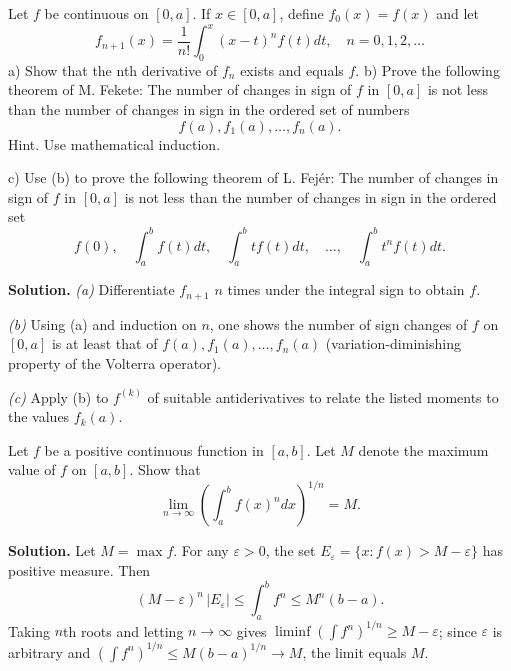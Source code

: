 \begin{problembox}
Let $f$ be continuous on $[0, a]$. If $x \in [0, a]$, define $f_0(x) = f(x)$ and let 
\[f_{n+1}(x) = \frac{1}{n!} \int_0^x (x - t)^n f(t) dt, \quad n = 0, 1, 2, \ldots\]
a) Show that the nth derivative of $f_n$ exists and equals $f$.
b) Prove the following theorem of M. Fekete: The number of changes in sign of $f$ in $[0, a]$ is not less than the number of changes in sign in the ordered set of numbers 
\[f(a), f_1(a), \ldots, f_n(a).\]
Hint. Use mathematical induction.

c) Use (b) to prove the following theorem of L. Fejér: The number of changes in sign of $f$ in $[0, a]$ is not less than the number of changes in sign in the ordered set
\[f(0), \quad \int_{a}^{b} f(t) dt, \quad \int_{a}^{b} t f(t) dt, \quad \ldots, \quad \int_{a}^{b} t^{n} f(t) dt.\]
\end{problembox}

\noindent\textbf{Solution.}
\textit{(a)} Differentiate $f_{n+1}$ $n$ times under the integral sign to obtain $f$. 

\textit{(b)} Using (a) and induction on $n$, one shows the number of sign changes of $f$ on $[0,a]$ is at least that of $f(a),f_1(a),\dots,f_n(a)$ (variation-diminishing property of the Volterra operator).

\textit{(c)} Apply (b) to $f^{(k)}$ of suitable antiderivatives to relate the listed moments to the values $f_k(a)$.
\medskip

\begin{problembox}
Let $f$ be a positive continuous function in $[a, b]$. Let $M$ denote the maximum value of $f$ on $[a, b]$. Show that
\[\lim_{n \to \infty} \left( \int_{a}^{b} f(x)^{n} dx \right)^{1/n} = M.\]
\end{problembox}

\noindent\textbf{Solution.}
Let $M=\max f$. For any $\varepsilon>0$, the set $E_\varepsilon=\{x:f(x)>M-\varepsilon\}$ has positive measure. Then
\[(M-\varepsilon)^n\,|E_\varepsilon|\le \int_a^b f^n\le M^n(b-a).
\]
Taking $n$th roots and letting $n\to\infty$ gives $\liminf (\int f^n)^{1/n}\ge M-\varepsilon$; since $\varepsilon$ is arbitrary and $(\int f^n)^{1/n}\le M(b-a)^{1/n}\to M$, the limit equals $M$.
\medskip

